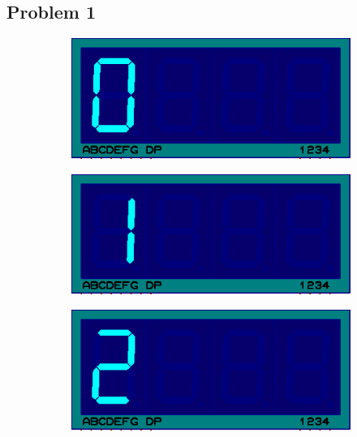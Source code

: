\documentclass{lab_sheet}
\begin{document}
    \subsection*{Problem 1}
\begin{figure}[H]
\begin{subfigure}{.33\textwidth}
  \centering
  \includegraphics[frame,width=.9\linewidth]{../Figures/s0}  
  \label{fig:prob1-a}
  \caption{}
\end{subfigure}
\begin{subfigure}{.33\textwidth}
  \centering
  \includegraphics[frame,width=.9\linewidth]{../Figures/s1}  
  \label{fig:prob1-b}
  \caption{}
\end{subfigure}
\begin{subfigure}{.33\textwidth}
  \centering
    \includegraphics[frame,width=.9\linewidth]{../Figures/s2}  
  \label{fig:prob1-c}
  \caption{}
\end{subfigure}
\newline
\begin{subfigure}{.33\textwidth}

\end{subfigure}
\end{figure}
\end{document}
